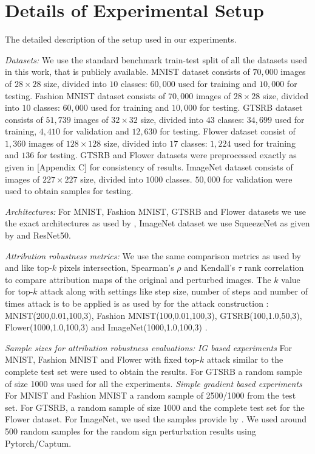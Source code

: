 \documentclass[letterpaper]{article} %
\begin{document}

\section{Details of Experimental Setup} \label{app:exp-setup}
The detailed description of the setup used in our experiments.

\textit{Datasets:} We use the standard benchmark train-test split of all the datasets used in this work, that is publicly available. MNIST dataset consists of $70,000$ images of $28 \times 28$ size, divided into $10$ classes: $60,000$ used for training and $10,000$ for testing. Fashion MNIST dataset consists of $70,000$ images of $28 \times 28$ size, divided into $10$ classes: $60,000$ used for training and $10,000$ for testing. GTSRB dataset consists of $51,739$ images of $32 \times 32$ size, divided into $43$ classes: $34,699$ used for training, $4,410$ for validation and $12,630$ for testing. Flower dataset consist of $1,360$ images of $128 \times 128$ size, divided into $17$ classes: $1,224$ used for training and $136$ for testing. GTSRB and Flower datasets were preprocessed exactly as given in \cite{chen2019robust}[Appendix C] for consistency of results. ImageNet dataset consists of images of $227 \times 227$ size, divided into $1000$ classes. $50,000$ for validation were used to obtain samples for testing.

\textit{Architectures:} For MNIST, Fashion MNIST, GTSRB and Flower datasets we use the exact architectures as used by \citet{chen2019robust}, ImageNet dataset we use SqueezeNet\citep{IandolaMAHDK16} as given by \citet{ghorbani2018interpretation} and ResNet50\citep{HeZRS15}.

\textit{Attribution robustness metrics:} We use the same comparison metrics as used by \citet{ghorbani2018interpretation} and \citet{chen2019robust} like top-$k$ pixels intersection, Spearman's $\rho$ and Kendall's $\tau$ rank correlation to compare attribution maps of the original and perturbed images. The $k$ value for top-$k$ attack along with settings like step size, number of steps and number of times attack is to be applied is as used by \citet{chen2019robust} for the attack construction : MNIST(200,0.01,100,3), Fashion MNIST(100,0.01,100,3), GTSRB(100,1.0,50,3), Flower(1000,1.0,100,3) and ImageNet(1000,1.0,100,3) \citep{ghorbani2018interpretation}.

\textit{Sample sizes for attribution robustness evaluations:} \textit{IG based experiments} For MNIST, Fashion MNIST and Flower with fixed top-$k$ attack similar to \citet{chen2019robust} the complete test set were used to obtain the results. For GTSRB a random sample of size 1000 was used for all the experiments.  \textit{Simple gradient based experiments} For MNIST and Fashion MNIST a random sample of 2500/1000 from the test set. For GTSRB, a random sample of size 1000 and the complete test set for the Flower dataset. For ImageNet, we used the samples provide by \citet{ghorbani2018interpretation}. We used around 500 random samples for the random sign perturbation results using Pytorch/Captum.
\end{document}
